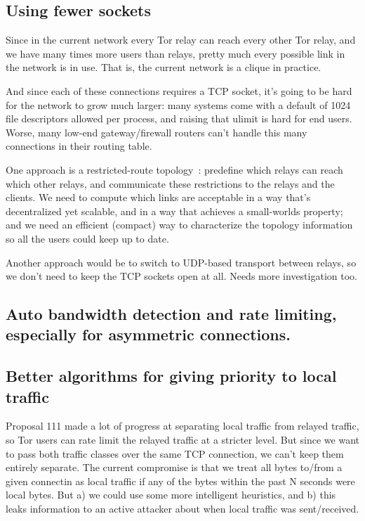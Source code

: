 \documentclass{article}
\begin{document}
\subsection{Using fewer sockets}

Since in the current network every Tor relay can reach every other Tor
relay, and we have many times more users than relays, pretty much every
possible link in the network is in use. That is, the current network
is a clique in practice.

And since each of these connections requires a TCP socket, it's going
to be hard for the network to grow much larger: many systems come with
a default of 1024 file descriptors allowed per process, and raising
that ulimit is hard for end users. Worse, many low-end gateway/firewall
routers can't handle this many connections in their routing table.

One approach is a restricted-route topology~\cite{danezis:pet2003}:
predefine which relays can reach which other relays, and communicate
these restrictions to the relays and the clients. We need to compute
which links are acceptable in a way that's decentralized yet scalable,
and in a way that achieves a small-worlds property; and we
need an efficient (compact) way to characterize the topology information
so all the users could keep up to date.

Another approach would be to switch to UDP-based transport between
relays, so we don't need to keep the TCP sockets open at all. Needs more
investigation too.

\subsection{Auto bandwidth detection and rate limiting, especially for
      asymmetric connections.}


\subsection{Better algorithms for giving priority to local traffic}

Proposal 111 made a lot of progress at separating local traffic from
relayed traffic, so Tor users can rate limit the relayed traffic at a
stricter level. But since we want to pass both traffic classes over the
same TCP connection, we can't keep them entirely separate. The current
compromise is that we treat all bytes to/from a given connectin as
local traffic if any of the bytes within the past N seconds were local
bytes.  But a) we could use some more intelligent heuristics, and b)
this leaks information to an active attacker about when local traffic
was sent/received.
\end{document}
